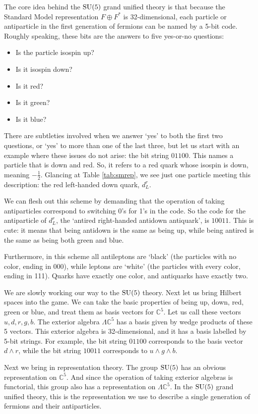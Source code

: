 \documentclass{article}
\newcommand{\C}{{\mathbb C}}  %
\newcommand{\SU}{{\rm SU}}    %
\newcommand{\half}{\frac{1}{2}} %
\begin{document}
The core idea behind the $\SU(5)$ grand unified theory is that because
the Standard Model representation $F \oplus F^*$ is 32-dimensional,
each particle or antiparticle in the first generation of fermions can
be named by a 5-bit code.  Roughly speaking, these bits are the answers 
to five yes-or-no questions:
\begin{itemize}
\item Is the particle isospin up?
\item Is it isospin down?
\item Is it red?
\item Is it green?
\item Is it blue?
\end{itemize}
There are subtleties involved when we answer `yes' to both the
first two questions, or `yes' to more than one of the last three, but
let us start with an example where these issues do not arise:
the bit string $01100$.  This names a particle that is down and red.
So, it refers to a red quark whose isospin is down, meaning $-\half$.
Glancing at Table \ref{tab:smrep}, we see just one particle meeting
this description: the red left-handed down quark, $d^r_L$.

We can flesh out this scheme by demanding that the operation of taking
antiparticles correspond to switching 0's for 1's in the code.  So the
code for the antiparticle of $d^r_L$, the `antired right-handed
antidown antiquark', is $10011$.  This is cute: it means that being
antidown is the same as being up, while being antired is the same as
being both green and blue.

Furthermore, in this scheme all antileptons are `black' (the particles
with no color, ending in 000), while leptons are `white' (the particles
with every color, ending in 111).  Quarks have exactly one color, and
antiquarks have exactly two.

We are slowly working our way to the $\SU(5)$ theory.  Next let us bring
Hilbert spaces into the game.  We can take the basic properties of
being up, down, red, green or blue, and treat them as basis vectors for
$\C^5$.  Let us call these vectors $u,d,r,g,b$.  The exterior algebra
$\Lambda \C^5$ has a basis given by wedge products of these 5 vectors.
This exterior algebra is 32-dimensional, and it has a basis labelled by
5-bit strings.  For example, the bit string $01100$ corresponds to the
basis vector $d \wedge r$, while the bit string $10011$ corresponds to
$u \wedge g \wedge b$.

Next we bring in representation theory.  The group $\SU(5)$ has an
obvious representation on $\C^5$.  And since the operation of taking
exterior algebras is functorial, this group also has a representation
on $\Lambda \C^5$.  In the $\SU(5)$ grand unified theory, this is the
representation we use to describe a single generation of fermions and
their antiparticles.
\end{document}
